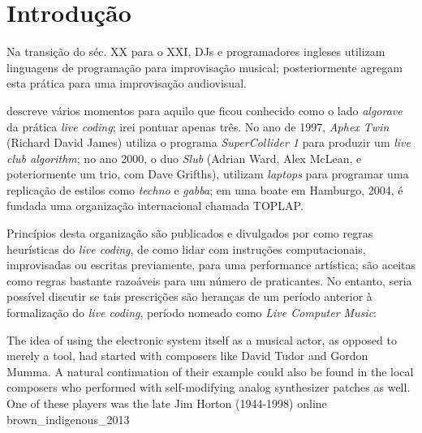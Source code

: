 \chapter*[Introdução]{Introdução} 

Na transição do séc. XX para o XXI,  DJs e programadores ingleses utilizam linguagens de programação para improvisação musical; posteriormente agregam esta prática para uma improvisação audiovisual. 

 descreve vários momentos para aquilo que ficou conhecido como o lado \emph{algorave} da prática \emph{live coding}; irei pontuar apenas três. No ano de 1997, \emph{Aphex Twin} (Richard David James) utiliza o programa \emph{SuperCollider 1} para produzir um \emph{live club algorithm}; no ano 2000, o duo \emph{Slub} (Adrian Ward, Alex McLean, e poteriormente um trio, com Dave Grifths), utilizam \emph{laptops} para programar uma replicação de estilos como \emph{techno} e \emph{gabba}; em uma boate em Hamburgo, 2004, é fundada uma organização internacional chamada TOPLAP.

Princípios desta organização são publicados e divulgados por  como regras heurísticas do \emph{live coding}, de como lidar com instruções computacionais, improvisadas ou escritas previamente, para uma performance artística; são aceitas como regras bastante razoáveis para um número de praticantes. No entanto, seria possível discutir se tais prescrições são heranças de um período anterior à formalização do \emph{live coding}, período nomeado como \emph{Live Computer Music}:


{The idea of using the electronic system itself as a musical actor, as opposed to merely a tool, had started with composers like David Tudor and Gordon Mumma. A natural continuation of their example could also be found in the local composers who performed with self-modifying analog synthesizer patches as well. One of these players was the late Jim Horton (1944-1998)}
{online}
{brown_indigenous_2013}

